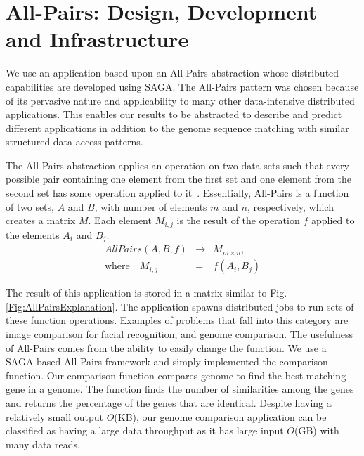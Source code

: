 \documentclass{rspublic}
\begin{document}
\vspace{-0.3cm}

\section{All-Pairs: Design, Development and Infrastructure} We use an
application based upon an All-Pairs abstraction whose distributed
capabilities are developed using SAGA. The All-Pairs pattern was
chosen because of its pervasive nature and applicability to many other
data-intensive distributed applications. This enables our results to
be abstracted to describe and predict different applications in
addition to the genome sequence matching with similar structured
data-access patterns.

The All-Pairs abstraction applies an operation on two data-sets such
that every possible pair containing one element from the first set and
one element from the second set has some operation applied to
it~\citep{AllPairs}. Essentially, All-Pairs is a function of two sets,
$A$ and $B$, with number of elements $m$ and $n$, respectively, which
creates a matrix $M$. Each element $M_{i,j}$ is the result of the
operation $f$ applied to the elements $A_i$ and $B_j$.
\begin{eqnarray}
 AllPairs(A, B, f) & \rightarrow & M_{m \times n}, \\
\mbox{where} \quad M_{i,j} & = & f(A_{i},B_{j})
 \end{eqnarray}

The result of this application is stored in a matrix similar to Fig.
\ref{Fig:AllPairsExplanation}. The application spawns distributed jobs
to run sets of these function operations. Examples of problems that fall
into this category are image comparison for facial recognition, and
genome comparison.  The usefulness of All-Pairs comes from the ability
to easily change the function.  We use a SAGA-based All-Pairs framework
and simply implemented the comparison function.  Our comparison function
compares genome to find the best matching gene in a genome.  The
function finds the number of similarities among the genes and returns
the percentage of the genes that are identical. Despite having a
relatively small output $O$(KB), our genome comparison application can
be classified as having a large data throughput as it has large input
$O$(GB) with many data reads.
\end{document}
